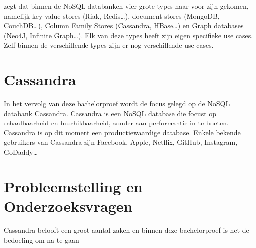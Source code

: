 \cite{Sadalage2014OverviewNoSQL} zegt dat binnen de NoSQL databanken vier grote types naar voor zijn gekomen, namelijk key-value stores (Riak, Redis\dots), document stores (MongoDB, CouchDB\dots), Column Family Stores (Cassandra, HBase\dots) en Graph databases (Neo4J, Infinite Graph\dots).
Elk van deze types heeft zijn eigen specifieke use cases.
Zelf binnen de verschillende types zijn er nog verschillende use cases.

\section{Cassandra}

In het vervolg van deze bachelorproef wordt de focus gelegd op de NoSQL databank Cassandra.
Cassandra is een NoSQL database die focust op schaalbaarheid en beschikbaarheid, zonder aan performantie in te boeten.
Cassandra is op dit moment een productiewaardige database.
Enkele bekende gebruikers van Cassandra zijn Facebook, Apple, Netflix, GitHub, Instagram, GoDaddy\dots 



\section{Probleemstelling en Onderzoeksvragen}
\label{sec:onderzoeksvragen}

Cassandra belooft een groot aantal zaken en binnen deze bachelorproef is het de bedoeling om na te gaan 

